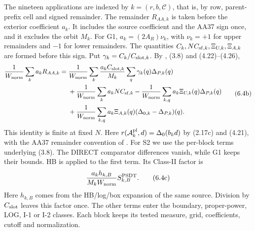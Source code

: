 The nineteen applications are indexed by $k=(r,b,\mathcal C)$,
that is, by row, parent-prefix cell and signed remainder.
The remainder $R_{AA,k}$ is taken before the exterior coefficient $a_k$.
It includes the source coefficient and the AA37 sign once,
and it excludes the orbit $M_k$.
For G1, $a_k=(2A_R)\nu_k$, with $\nu_k=+1$ for upper remainders
and $-1$ for lower remainders.
The quantities $C_k,NC_{{\rm sf},k},\Xi_{U,k},\Xi_{A,k}$ are formed before this sign.
Put $\gamma_k=C_k/C_{{\rm slot},k}$.
By \cite[(2.32)--(2.33)]{Z1}, (3.8) and (4.22)--(4.26),
\[
\begin{split}
\frac1{W_{\rm norm}}\sum_k a_kR_{AA,k}
={}&\frac1{W_{\rm norm}}\sum_k\frac{a_kC_{{\rm slot},k}}{M_k}
                  \sum_q\gamma_k(q)\Delta_{P,k}(q)\\
&+\frac1{W_{\rm norm}}\sum_k a_kNC_{{\rm sf},k}
-\frac1{W_{\rm norm}}\sum_{k,q}a_k\Xi_{U,k}(q)\Delta_{P,k}(q)\\
&+\frac1{W_{\rm norm}}\sum_{k,q}a_k\Xi_{A,k}(q)
                    (\Delta_{0,k}-\Delta_{P,k})(q).
\end{split}\tag{6.4b}
\]
This identity is finite at fixed $N$.
Here $r(\mathcal A_k^{\rm pl},d)=\Delta_0(b_kd)$ by (2.17c) and (4.21),
with the AA37 remainder convention of \cite[(2.32)--(2.33)]{Z1}.
For S2 we use the per-block terms underlying (3.8).
The DIRECT comparator differences vanish, while G1 keeps their bounds.
HB is applied to the first term. Its Class-II factor is
\[
\frac{a_kh_{k,B}}{M_kW_{\rm norm}}S^{\rm PSDT}_{k,B}.\tag{6.4c}
\]
Here $h_{k,B}$ comes from the HB/log/box expansion of the same source.
Division by $C_{\rm slot}$ leaves this factor once.
The other terms enter the boundary, proper-power, LOG, I-1 or I-2 classes.
Each block keeps its tested measure, grid, coefficients, cutoff and normalization.

